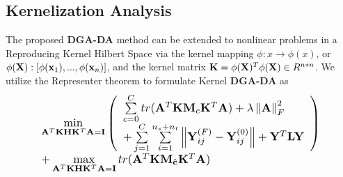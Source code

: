 \documentclass[journal,twocolumn]{IEEEtran}
\begin{document}
\begin{CJK*}{UTF8}{gkai}
\vspace{-10pt} 
			
	\subsection{Kernelization Analysis}
    \label{ssection:Kernelization Analysis}
	The proposed \textbf{DGA-DA} method can be extended to nonlinear problems in a Reproducing Kernel Hilbert Space via the kernel mapping $\phi :x \to \phi (x)$, or $\phi ({\bf{X}}):[\phi ({{\bf{x}}_1}),...,\phi ({{\bf{x}}_n})]$, and the kernel matrix ${\bf{K}} = \phi {({\bf{X}})^T}\phi ({\bf{X}}) \in {R^{n*n}}$. We utilize
	the Representer theorem to formulate Kernel \textbf{DGA-DA} as
	\begin{equation}\label{eq:kernel}
		\resizebox{0.9\hsize}{!}{%
			$\begin{array}{*{20}{l}}
			{\begin{array}{*{20}{l}}
				{\mathop {\min }\limits_{{{\bf{A}}^T}{\bf{KH}}{{\bf{K}}^T}{\bf{A}} = {\bf{I}}} \left( {\begin{array}{*{20}{l}}
						{\sum\limits_{c = 0}^C {tr({{\bf{A}}^T}{\bf{K}}{{\bf{M}}_c}{{\bf{K}}^T}{\bf{A}})}  + \lambda \left\| {\bf{A}} \right\|_F^2}\\
						{ + \sum\limits_{j = 1}^C {\sum\limits_{i = 1}^{{n_s} + {n_t}} {\left\| {{\bf{Y}}_{ij}^{(F)} - {\bf{Y}}_{ij}^{(0)}} \right\|} }  + {{\bf{Y}}^T}{\bf{LY}}}
						\end{array}} \right)}\\
				{ + \mathop {\max }\limits_{{{\bf{A}}^T}{\bf{KH}}{{\bf{K}}^T}{\bf{A}} = {\bf{I}}} tr({{\bf{A}}^T}{\bf{K}}{{\bf{M}}_{{\bf{\hat c}}}}{{\bf{K}}^T}{\bf{A}})}
				\end{array}}
			\end{array}$}
	\end{equation}





	

\end{CJK*}
\end{document}
